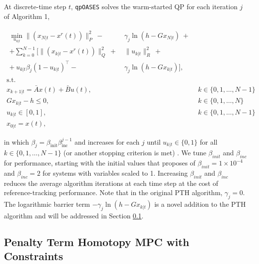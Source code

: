 \documentclass[journal,twoside,web]{ieeecolor}
\begin{document}
At discrete-time step $t$, \texttt{qpOASES} \cite{Ferreau2014} solves the warm-started QP for each iteration $j$ of Algorithm 1,

\begin{subequations}
\begin{align}  
\begin{split}
\min_{u_{k|t}} \|(x_{N|t}-x^r(t))\|^2_P ~ - ~ & \gamma_j \ln \left(h-Gx_{N|t} \right) ~+ \\
+ \sum_{k=0}^{N-1}\biggl[ \|(x_{k|t}-x^r(t))\|^2_Q ~+~ & \|u_{k|t}\|^2_R ~+  \\
+~ u_{k|t} \beta_j (1-u_{k|t})^{\top} -~ & \gamma_j \ln \left(h-Gx_{k|t} \right)  \biggr], \label{eq:PTHobjective} 
\end{split}  \\
\textrm{s.t.} & \nonumber \\
x_{k+1|t} = \bar{A}x(t)+\bar{B}u(t), \quad & k \in \{0,1,\ldots,N-1\} \label{eq:PTHstateEvo} \\
Gx_{k|t}-h \leq 0, \quad & k \in \{0,1,\ldots,N\} \label{eq:PTHlincons}\\
u_{k|t} \in [0,1], \quad & k \in \{0,1,\ldots,N-1\} \label{eq:nonbinary} \\ 
x_{0|t} = x(t), \quad & 
\end{align} \label{eq:PTHMPC}
\end{subequations}

\noindent in which $\beta_j = \beta_{\textrm{init}} \beta_{\textrm{inc}}^{j-1}$ and increases for each $j$ until $u_{k|t} \in \{0,1\}$ for all $ k \in \{0,1,\ldots,N-1\}$ (or another stopping criterion is met) \cite{Sager2006}. We tune $\beta_{init}$ and $\beta_{inc}$ for performance, starting with the initial values that \cite{Sager2006} proposes of $\beta_{init} = 1\times 10^{-4}$ and $\beta_{inc} = 2$ for systems with variables scaled to 1. Increasing $\beta_{init}$ and $\beta_{inc}$ reduces the average algorithm iterations at each time step at the cost of reference-tracking performance. Note that in the original PTH algorithm, $\gamma_j=0$. The logarithmic barrier term $-\gamma_j \ln (h-Gx_{k|t})$ is a novel addition to the PTH algorithm and will be addressed in Section \ref{subsec:PTHmod}.

\subsection{Penalty Term Homotopy MPC with Constraints}
\label{subsec:PTHmod}
\end{document}
